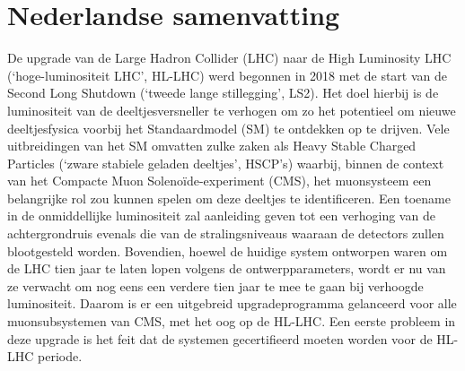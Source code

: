 \renewcommand\evenpagerightmark{{\scshape\small Nederlandse Samenvatting}}
\renewcommand\oddpageleftmark{{\scshape\small Dutch Summary}}

\hyphenation{}

\chapter[Nederlandse samenvatting]{Nederlandse samenvatting\\}
\label{samenvatting}

	De upgrade van de Large Hadron Collider (LHC) naar de High Luminosity LHC (‘hoge-luminositeit LHC’, HL-LHC) werd begonnen in 2018 met de start van de Second Long Shutdown (‘tweede lange stillegging’, LS2). Het doel hierbij is de luminositeit van de deeltjesversneller te verhogen om zo het potentieel om nieuwe deeltjesfysica voorbij het Standaardmodel (SM) te ontdekken op te drijven. Vele uitbreidingen van het SM omvatten zulke zaken als Heavy Stable Charged Particles (‘zware stabiele geladen deeltjes’, HSCP’s) waarbij, binnen de context van het Compacte Muon Solenoïde-experiment (CMS), het muonsysteem een belangrijke rol zou kunnen spelen om deze deeltjes te identificeren. Een toename in de onmiddellijke luminositeit zal aanleiding geven tot een verhoging van de achtergrondruis evenals die van de stralingsniveaus waaraan de detectors zullen blootgesteld worden. Bovendien, hoewel de huidige system ontworpen waren om de LHC tien jaar te laten lopen volgens de ontwerpparameters, wordt er nu van ze verwacht om nog eens een verdere tien jaar te mee te gaan bij verhoogde luminositeit. Daarom is er een uitgebreid upgradeprogramma gelanceerd voor alle muonsubsystemen van CMS, met het oog op de HL-LHC. Een eerste probleem in deze upgrade is het feit dat de systemen gecertifieerd moeten worden voor de HL-LHC periode.\\
